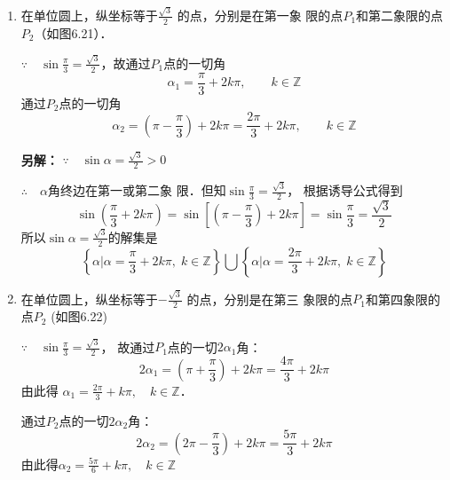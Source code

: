 \begin{solution}
\begin{enumerate}
    \item 在单位圆上，纵坐标等于$\frac{\sqrt{3}}{2}$
    的点，分别是在第一象
    限的点$P_1$和第二象限的点$P_2$（如图6.21）．

$\because\quad \sin\frac{\pi}{3}=\frac{\sqrt{3}}{2}$，故通过$P_1$点的一切角
\[\alpha_1=\frac{\pi}{3}+2k\pi,\qquad k\in\mathbb{Z}\]
通过$P_2$点的一切角
\[\alpha_2=\left(\pi-\frac{\pi}{3}\right)+2k\pi=\frac{2\pi}{3}+2k\pi,\qquad k\in\mathbb{Z}\]

\textbf{另解：}
$\because\quad \sin\alpha=\frac{\sqrt{3}}{2}>0$

$\therefore\quad \alpha$角终边在第一或第二象
限．但知$\sin\frac{\pi}{3}=\frac{\sqrt{3}}{2}$，
根据诱导公式得到
\[\sin\left(\frac{\pi}{3}+2k\pi\right)=\sin\left[\left(\pi-\frac{\pi}{3}\right)+2k\pi\right]=\sin\frac{\pi}{3}=\frac{\sqrt{3}}{2}\]
所以$\sin\alpha=\frac{\sqrt{3}}{2}$的解集是
\[\left\{\alpha\Big|\alpha=\frac{\pi}{3}+2k\pi,\; k\in\mathbb{Z}\right\}\bigcup \left\{\alpha\Big|\alpha=\frac{2\pi}{3}+2k\pi,\; k\in\mathbb{Z}\right\}\]

\item 在单位圆上，纵坐标等于$-\frac{\sqrt{3}}{2}$
的点，分别是在第三
象限的点$P_1$和第四象限的点$P_2$ (如图6.22)

\begin{figure}[htp]
    \centering
{}
    \caption{}
\end{figure}


$\because\quad \sin\frac{\pi}{3}=\frac{\sqrt{3}}{2}$，
故通过$P_1$点的一切$2\alpha_1$角：
\[2\alpha_1=\left(\pi+\frac{\pi}{3}\right)+2k\pi=\frac{4\pi}{3}+2k\pi\]
由此得 $\alpha_1=\frac{2\pi}{3}+k\pi,\quad k\in\mathbb{Z}$．

通过$P_2$点的一切$2\alpha_2$角：
\[2\alpha_2=\left(2\pi-\frac{\pi}{3}\right)+2k\pi=\frac{5\pi}{3}+2k\pi\]
由此得$\alpha_2=\frac{5\pi}{6}+k\pi,\quad k\in\mathbb{Z}$


\end{enumerate}
\end{solution}
